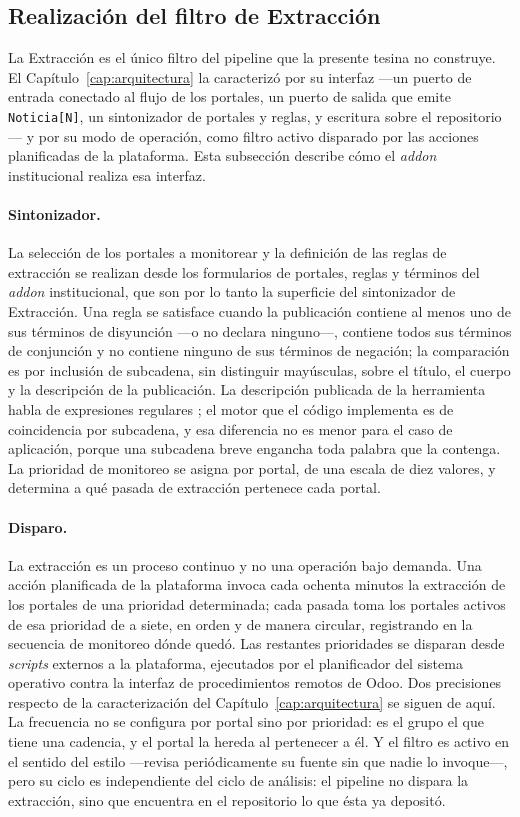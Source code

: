 \documentclass[12pt]{report}
\begin{document}
\subsection{Realización del filtro de Extracción}
\label{sec:impl-pre-extraccion}

La Extracción es el único filtro del pipeline que la presente tesina no construye. El Capítulo~\ref{cap:arquitectura} la caracterizó por su interfaz ---un puerto de entrada conectado al flujo de los portales, un puerto de salida que emite \texttt{Noticia[N]}, un sintonizador de portales y reglas, y escritura sobre el repositorio--- y por su modo de operación, como filtro activo disparado por las acciones planificadas de la plataforma. Esta subsección describe cómo el \textit{addon} institucional realiza esa interfaz.

\paragraph{Sintonizador.} La selección de los portales a monitorear y la definición de las reglas de extracción se realizan desde los formularios de portales, reglas y términos del \textit{addon} institucional, que son por lo tanto la superficie del sintonizador de Extracción. Una regla se satisface cuando la publicación contiene al menos uno de sus términos de disyunción ---o no declara ninguno---, contiene todos sus términos de conjunción y no contiene ninguno de sus términos de negación; la comparación es por inclusión de subcadena, sin distinguir mayúsculas, sobre el título, el cuerpo y la descripción de la publicación. La descripción publicada de la herramienta habla de expresiones regulares \citep{raimondo:2024}; el motor que el código implementa es de coincidencia por subcadena, y esa diferencia no es menor para el caso de aplicación, porque una subcadena breve engancha toda palabra que la contenga. La prioridad de monitoreo se asigna por portal, de una escala de diez valores, y determina a qué pasada de extracción pertenece cada portal.

\paragraph{Disparo.} La extracción es un proceso continuo y no una operación bajo demanda. Una acción planificada de la plataforma invoca cada ochenta minutos la extracción de los portales de una prioridad determinada; cada pasada toma los portales activos de esa prioridad de a siete, en orden y de manera circular, registrando en la secuencia de monitoreo dónde quedó. Las restantes prioridades se disparan desde \textit{scripts} externos a la plataforma, ejecutados por el planificador del sistema operativo contra la interfaz de procedimientos remotos de Odoo. Dos precisiones respecto de la caracterización del Capítulo~\ref{cap:arquitectura} se siguen de aquí. La frecuencia no se configura por portal sino por prioridad: es el grupo el que tiene una cadencia, y el portal la hereda al pertenecer a él. Y el filtro es activo en el sentido del estilo ---revisa periódicamente su fuente sin que nadie lo invoque---, pero su ciclo es independiente del ciclo de análisis: el pipeline no dispara la extracción, sino que encuentra en el repositorio lo que ésta ya depositó.
\end{document}
